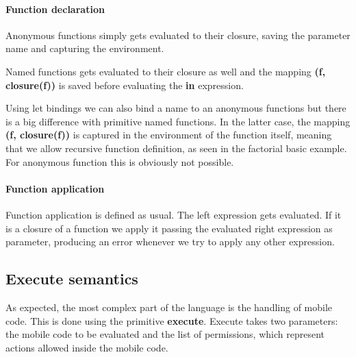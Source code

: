 \documentclass{article}
\begin{document}
\paragraph{Function declaration}
Anonymous functions simply gets evaluated to their closure, saving the parameter name and capturing the environment.  

Named functions gets evaluated to their closure as well and  the mapping 
\textbf{(f, closure(f))} is saved  before evaluating the \textbf{in} expression. 

Using let bindings we can also bind a name to an anonymous functions but there is a big difference with primitive named functions. In the latter case, the mapping \textbf{(f, closure(f))} is captured in the environment of the function itself, 
meaning that we allow recursive function definition, as seen in the factorial basic example. For anonymous function this is obviously not possible.

\paragraph{Function application}
Function application is defined as usual. The left expression gets evaluated. If it is a closure of a function we apply it passing the evaluated right expression as parameter, producing an error whenever we try to apply any other expression.

\subsection{Execute semantics}

As expected, the most complex part of the language is the handling of mobile code. 
This is done using the primitive \textbf{execute}. Execute takes two parameters: the mobile code to be evaluated and the list of permissions, which represent actions allowed inside the mobile code. 
\end{document}
